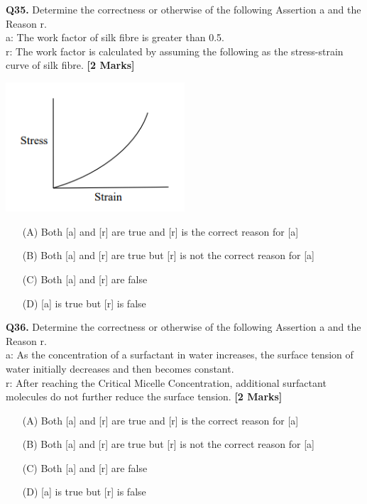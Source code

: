 \documentclass[11pt]{article}
\newcommand{\questionb}[2]{
    \noindent\textbf{Q#2.} #1 \hfill \textbf{[2 Marks]}
}
\begin{document}
\questionb{Determine the correctness or otherwise of the following Assertion a and the Reason r. \\
a: The work factor of silk fibre is greater than 0.5. \\
r: The work factor is calculated by assuming the following as the stress-strain curve of silk fibre.}{35}
\begin{center}
\includegraphics[width=0.5\textwidth]{figures/35.png}
\end{center}
\begin{enumerate}
    \item[(A)] Both [a] and [r] are true and [r] is the correct reason for [a]
    \item[(B)] Both [a] and [r] are true but [r] is not the correct reason for [a]
    \item[(C)] Both [a] and [r] are false
    \item[(D)] [a] is true but [r] is false
\end{enumerate}
\vspace{0.5cm}

\questionb{Determine the correctness or otherwise of the following Assertion a and the Reason r. \\
a: As the concentration of a surfactant in water increases, the surface tension of water initially decreases and then becomes constant. \\
r: After reaching the Critical Micelle Concentration, additional surfactant molecules do not further reduce the surface tension.}{36}
\begin{enumerate}
    \item[(A)] Both [a] and [r] are true and [r] is the correct reason for [a]
    \item[(B)] Both [a] and [r] are true but [r] is not the correct reason for [a]
    \item[(C)] Both [a] and [r] are false
    \item[(D)] [a] is true but [r] is false
\end{enumerate}
\vspace{0.5cm}
\end{document}
